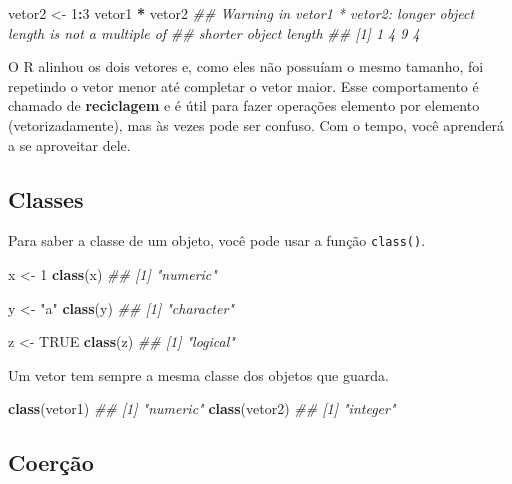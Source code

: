 \documentclass[]{book}
\newenvironment{Shaded}{\begin{snugshade}}{\end{snugshade}}
\newcommand{\CommentTok}[1]{\textcolor[rgb]{0.56,0.35,0.01}{\textit{#1}}}
\newcommand{\DecValTok}[1]{\textcolor[rgb]{0.00,0.00,0.81}{#1}}
\newcommand{\KeywordTok}[1]{\textcolor[rgb]{0.13,0.29,0.53}{\textbf{#1}}}
\newcommand{\NormalTok}[1]{#1}
\newcommand{\OperatorTok}[1]{\textcolor[rgb]{0.81,0.36,0.00}{\textbf{#1}}}
\newcommand{\OtherTok}[1]{\textcolor[rgb]{0.56,0.35,0.01}{#1}}
\newcommand{\StringTok}[1]{\textcolor[rgb]{0.31,0.60,0.02}{#1}}
\begin{document}
\begin{Shaded}
\begin{Highlighting}[]
\NormalTok{vetor2 <-}\StringTok{ }\DecValTok{1}\OperatorTok{:}\DecValTok{3}
\NormalTok{vetor1 }\OperatorTok{*}\StringTok{ }\NormalTok{vetor2}
\CommentTok{## Warning in vetor1 * vetor2: longer object length is not a multiple of}
\CommentTok{## shorter object length}
\CommentTok{## [1] 1 4 9 4}
\end{Highlighting}
\end{Shaded}

O R alinhou os dois vetores e, como eles não possuíam o mesmo tamanho, foi repetindo o vetor menor até completar o vetor maior. Esse comportamento é chamado de \textbf{reciclagem} e é útil para fazer operações elemento por elemento (vetorizadamente), mas às vezes pode ser confuso. Com o tempo, você aprenderá a se aproveitar dele.

\hypertarget{classes}{%
\subsection{Classes}\label{classes}}

Para saber a classe de um objeto, você pode usar a função \texttt{class()}.

\begin{Shaded}
\begin{Highlighting}[]
\NormalTok{x <-}\StringTok{ }\DecValTok{1}
\KeywordTok{class}\NormalTok{(x)}
\CommentTok{## [1] "numeric"}

\NormalTok{y <-}\StringTok{ "a"}
\KeywordTok{class}\NormalTok{(y)}
\CommentTok{## [1] "character"}

\NormalTok{z <-}\StringTok{ }\OtherTok{TRUE}
\KeywordTok{class}\NormalTok{(z)}
\CommentTok{## [1] "logical"}
\end{Highlighting}
\end{Shaded}

Um vetor tem sempre a mesma classe dos objetos que guarda.

\begin{Shaded}
\begin{Highlighting}[]
\KeywordTok{class}\NormalTok{(vetor1)}
\CommentTok{## [1] "numeric"}
\KeywordTok{class}\NormalTok{(vetor2)}
\CommentTok{## [1] "integer"}
\end{Highlighting}
\end{Shaded}

\hypertarget{coeruxe7uxe3o}{%
\subsection{Coerção}\label{coeruxe7uxe3o}}
\end{document}
